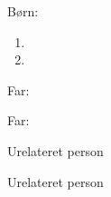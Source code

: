 \documentclass{article}
\begin{document}
\begin{genProfile}[
	name parts = {Jens,Hansen},
]
	Børn:
	\begin{enumerate}
	\item {}
	\item {}
	\end{enumerate}

\end{genProfile}

\clearpage

\begin{genProfile}[
	name parts = {Hans,Jensen},
]
	Far:

\end{genProfile}

\clearpage

\begin{genProfile}[
	name parts = {Jens,Jensen},
]
	Far:

\end{genProfile}

\clearpage

\begin{genProfile}[
	name parts = {Jens,Hansen,Smed},
]
	Urelateret person

\end{genProfile}

\clearpage

\begin{genProfile}[
	name parts = {Henrik,Jensen},
]
	Urelateret person

\end{genProfile}
\end{document}

